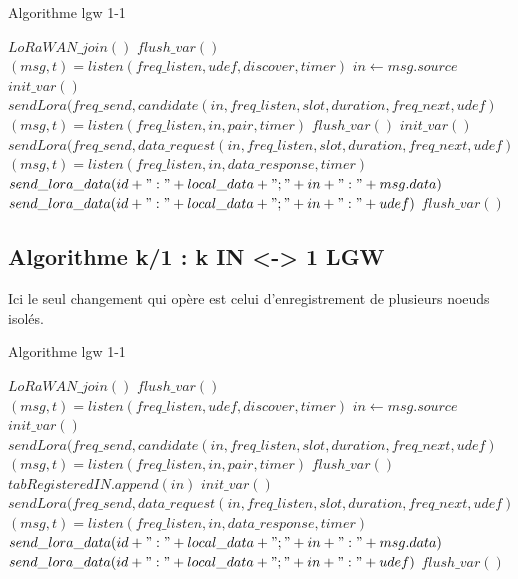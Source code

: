 \begin{algorithm}
\caption{Algorithme lgw 1-1}\label{alg:lgw1-1}
\begin{algorithmic}[1]
\State $LoRaWAN\_join()$
\State $flush\_var()$
    \State $(msg,t) = listen(freq\_listen,udef,discover,timer)$
  \EndIf
    \State $in \leftarrow msg.source$
    \State $init\_var()$
    \State $sendLora(freq\_send,candidate(in,freq\_listen,slot,duration,freq\_next,udef)$
    \State $(msg,t) = listen(freq\_listen,in,pair,timer)$
      \State $flush\_var()$
    \EndIf
  \EndIf
    \State $init\_var()$
    \State $sendLora(freq\_send,data\_request(in,freq\_listen,slot,duration,freq\_next,udef)$
    \State $(msg,t) = listen(freq\_listen,in,data\_response,timer)$
      \State $send\_lora\_data(id + ":" + local\_data + ";" + in + ":" + msg.data)$
    \Else
      \State $send\_lora\_data(id + ":" + local\_data + ";" + in + ":" + udef)$
      \State $flush\_var()$
    \EndIf
  \EndIf
\EndWhile
\end{algorithmic}
\end{algorithm}

\newpage
\subsection{Algorithme k/1 : k IN <-> 1 LGW}
Ici le seul changement qui opère est celui d'enregistrement de plusieurs noeuds isolés.
\begin{algorithm}
\caption{Algorithme lgw 1-1}\label{alg:lgwk-1}
\begin{algorithmic}[1]
\State $LoRaWAN\_join()$
\State $flush\_var()$
    \State $(msg,t) = listen(freq\_listen,udef,discover,timer)$
  \EndIf
    \State $in \leftarrow msg.source$
    \State $init\_var()$
    \State $sendLora(freq\_send,candidate(in,freq\_listen,slot,duration,freq\_next,udef)$
    \State $(msg,t) = listen(freq\_listen,in,pair,timer)$
      \State $flush\_var()$
    \EndIf
  \EndIf
 	 	\State $ tabRegisteredIN.append(in)$
 	 \EndIf
  	  \State $init\_var()$
  	  \State $sendLora(freq\_send,data\_request(in,freq\_listen,slot,duration,freq\_next,udef)$
  	 \State $(msg,t) = listen(freq\_listen,in,data\_response,timer)$
    	  \State $send\_lora\_data(id + ":" + local\_data + ";" + in + ":" + msg.data)$
    	\Else
    	  \State $send\_lora\_data(id + ":" + local\_data + ";" + in + ":" + udef)$
    	  \State $flush\_var()$
    \EndIf
  \EndIf
\EndWhile
\end{algorithmic}
\end{algorithm}
\newpage
